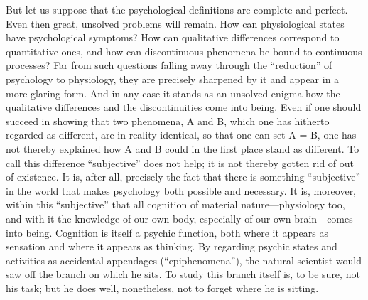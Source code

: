 \documentclass[12pt,a4paper]{book}
\newcommand{\opage}[1]{\marginnote{\footnotesize\textit{[#1]}}}
\begin{document}
But let us suppose that the psychological definitions are complete and
perfect. Even then great, unsolved problems will remain. How can
physiological states have psychological symptoms? How can qualitative
differences correspond to quantitative ones, and how can discontinuous
phenomena be bound to continuous processes? Far from such questions
falling away through the ``reduction'' of psychology to physiology, they
are precisely sharpened by it and appear in a more glaring form. And in
any case it stands as an unsolved enigma how the qualitative differences
and the discontinuities come into being. Even if one should succeed in
showing that two phenomena, A and B, which one has hitherto regarded as
different, are in reality identical, so that one can set A = B, one has
not thereby explained how A and B could in the first place stand as
different. To call this difference ``subjective'' does not help; it is
not thereby gotten rid of out of existence. It is, after all, precisely
the fact that there is something ``subjective'' in the world that makes
psychology both possible and necessary. It is, moreover, within this
``subjective'' that all cognition of material nature---physiology too,
and with it the knowledge of our own body, especially of our own
brain---comes into being. Cognition is itself a psychic function, both
where it appears as sensation and where it \opage{27}appears as thinking. By
regarding psychic states and activities as accidental appendages
(``epiphenomena''), the natural scientist would saw off the branch on
which he sits. To study this branch itself is, to be sure, not his task;
but he does well, nonetheless, not to forget where he is sitting.
\end{document}
